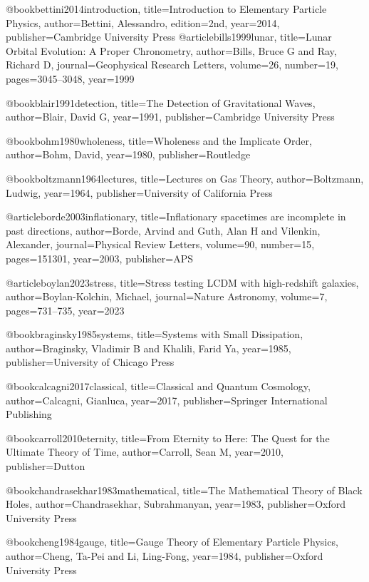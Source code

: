 \documentclass[aps,prresearch,reprint,onecolumn,superscriptaddress,nofootinbib,12pt]{revtex4-2}
\begin{document}
@book{bettini2014introduction,
  title={Introduction to Elementary Particle Physics},
  author={Bettini, Alessandro},
  edition={2nd},
  year={2014},
  publisher={Cambridge University Press}
}
@article{bills1999lunar,
  title={Lunar Orbital Evolution: A Proper Chronometry},
  author={Bills, Bruce G and Ray, Richard D},
  journal={Geophysical Research Letters},
  volume={26},
  number={19},
  pages={3045--3048},
  year={1999}
}

@book{blair1991detection,
  title={The Detection of Gravitational Waves},
  author={Blair, David G},
  year={1991},
  publisher={Cambridge University Press}
}

@book{bohm1980wholeness,
  title={Wholeness and the Implicate Order},
  author={Bohm, David},
  year={1980},
  publisher={Routledge}
}

@book{boltzmann1964lectures,
  title={Lectures on Gas Theory},
  author={Boltzmann, Ludwig},
  year={1964},
  publisher={University of California Press}
}

@article{borde2003inflationary,
  title={Inflationary spacetimes are incomplete in past directions},
  author={Borde, Arvind and Guth, Alan H and Vilenkin, Alexander},
  journal={Physical Review Letters},
  volume={90},
  number={15},
  pages={151301},
  year={2003},
  publisher={APS}
}

@article{boylan2023stress,
  title={Stress testing LCDM with high-redshift galaxies},
  author={Boylan-Kolchin, Michael},
  journal={Nature Astronomy},
  volume={7},
  pages={731--735},
  year={2023}
}

@book{braginsky1985systems,
  title={Systems with Small Dissipation},
  author={Braginsky, Vladimir B and Khalili, Farid Ya},
  year={1985},
  publisher={University of Chicago Press}
}

@book{calcagni2017classical,
  title={Classical and Quantum Cosmology},
  author={Calcagni, Gianluca},
  year={2017},
  publisher={Springer International Publishing}
}

@book{carroll2010eternity,
  title={From Eternity to Here: The Quest for the Ultimate Theory of Time},
  author={Carroll, Sean M},
  year={2010},
  publisher={Dutton}
}

@book{chandrasekhar1983mathematical,
  title={The Mathematical Theory of Black Holes},
  author={Chandrasekhar, Subrahmanyan},
  year={1983},
  publisher={Oxford University Press}
}

@book{cheng1984gauge,
  title={Gauge Theory of Elementary Particle Physics},
  author={Cheng, Ta-Pei and Li, Ling-Fong},
  year={1984},
  publisher={Oxford University Press}
}
\end{document}
